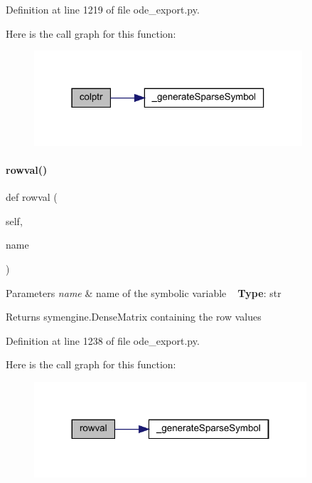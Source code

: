 Definition at line 1219 of file ode\+\_\+export.\+py.

Here is the call graph for this function\+:
\nopagebreak
\begin{figure}[H]
\begin{center}
\leavevmode
\includegraphics[width=283pt]{classamici_1_1ode__export_1_1_o_d_e_model_ad478875583922ae8d579486a03107557_cgraph}
\end{center}
\end{figure}
\mbox{\label{classamici_1_1ode__export_1_1_o_d_e_model_af1c1cc87fcc84bb17f41ee7fabaf795d}} 
\paragraph{\texorpdfstring{rowval()}{rowval()}}
{\footnotesize\ttfamily def rowval (\begin{DoxyParamCaption}\item[{}]{self,  }\item[{}]{name }\end{DoxyParamCaption})}


\begin{DoxyParams}{Parameters}
{\em name} & name of the symbolic variable ~\newline
{\bfseries{Type}}\+: str\\
\hline
\end{DoxyParams}
\begin{DoxyReturn}{Returns}
symengine.\+Dense\+Matrix containing the row values 
\end{DoxyReturn}


Definition at line 1238 of file ode\+\_\+export.\+py.

Here is the call graph for this function\+:
\nopagebreak
\begin{figure}[H]
\begin{center}
\leavevmode
\includegraphics[width=287pt]{classamici_1_1ode__export_1_1_o_d_e_model_af1c1cc87fcc84bb17f41ee7fabaf795d_cgraph}
\end{center}
\end{figure}
\mbox{\label{classamici_1_1ode__export_1_1_o_d_e_model_a8d081fd7c43cbb2bce7b4eca67fb94c5}} 
